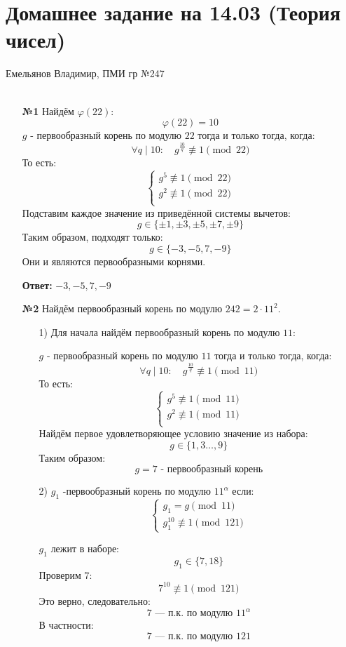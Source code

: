 \documentclass[a4paper]{article}
\renewcommand{\f}[2]{\frac{#1}{#2}}
\newcommand{\case}[1]{\begin{cases} #1 \end{cases}}
\renewcommand{\phi}{\varphi}
\newcommand{\divides}{\;|\;}
\begin{document}
\section*{Домашнее задание на 14.03 (Теория чисел)}
 {\large Емельянов Владимир, ПМИ гр №247}\\\\
\begin{enumerate}
    \item[\textbf{№1}]Найдём $\phi(22)$:
    $$\phi(22) = 10$$
    $g$ - первообразный корень по модулю $22$ тогда и только тогда, когда:
    $$\forall q \divides 10: \quad  g^{\f{10}{q}} \not \equiv 1 \pmod{22}$$
    То есть:
    $$\case{
        g^{5} \not \equiv 1 \pmod{ 22}\\
        g^{2} \not \equiv 1 \pmod{22}\\
    }$$
    Подставим каждое значение из приведённой системы вычетов:
    $$g \in \{\pm{1}, \pm{3}, \pm{5}, \pm{7}, \pm{9}\}$$
    Таким образом, подходят только:
    $$g \in \{-3, -5, 7, -9\}$$
    Они и являются первообразными корнями.

    \textbf{Ответ:} $-3, -5, 7, -9$\\

    \item[\textbf{№2}]Найдём первообразный корень по модулю $242 = 2\cdot 11^2$.
    \begin{enumerate}
        \item[1)] Для начала найдём первообразный корень по модулю $11$:
        
        $g$ - первообразный корень по модулю $11$ тогда и только тогда, когда:
        $$\forall q \divides 10: \quad  g^{\f{10}{q}} \not \equiv 1 \pmod{11}$$
        То есть:
        $$\case{
            g^{5} \not \equiv 1 \pmod{11}\\
            g^{2} \not \equiv 1 \pmod{11}\\
        }$$
        Найдём первое удовлетворяющее условию значение из набора:
        $$g \in \{1, 3 \dots, 9\}$$
        Таким образом:
        $$g=7 \text{ - первообразный корень}$$

        \item[2)] $g_1$ -первообразный корень по модулю $11^\alpha$ если:
        $$\case{
            g_1 = g \pmod{11}\\
            g_1^{10} \not \equiv 1 \pmod{121}
        }$$

        $g_1$ лежит в наборе:
        $$g_1 \in \{7, 18\}$$
        Проверим $7$:
        $$7^{10} \not \equiv 1 \pmod{121}$$
        Это верно, следовательно:
        $$7 \text{ --- п.к. по модулю } 11^\alpha$$
        В частности:
        $$7 \text{ --- п.к. по модулю } 121$$


\end{enumerate}
\end{enumerate}
\end{document}
